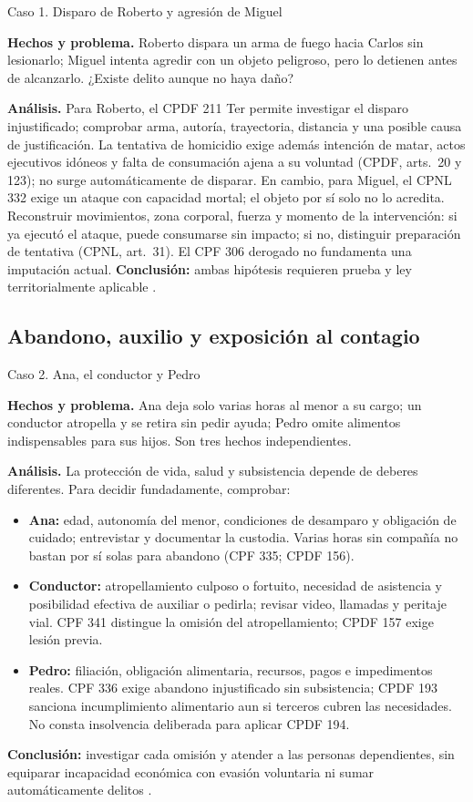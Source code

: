 \documentclass[spanish,letterpaper,oneside]{article}
\newcommand{\fichacaso}[1]{%
  \begin{tcolorbox}[colback=white,colframe=casoverde!25,
    boxrule=0.4pt,arc=0.6mm,left=1.6mm,right=1.6mm,top=1mm,bottom=1mm,
    before skip=0pt,after skip=3pt]
    #1
  \end{tcolorbox}%
}
\begin{document}
\begin{casoestudio}{Caso 1. Disparo de Roberto y agresión de Miguel}
\fichacaso{\textbf{Hechos y problema.} Roberto dispara un arma de fuego hacia Carlos sin lesionarlo; Miguel intenta agredir con un objeto peligroso, pero lo detienen antes de alcanzarlo. ¿Existe delito aunque no haya daño?}
\textbf{Análisis.} Para Roberto, el CPDF 211 Ter permite investigar el disparo injustificado; comprobar arma, autoría, trayectoria, distancia y una posible causa de justificación. La tentativa de homicidio exige además intención de matar, actos ejecutivos idóneos y falta de consumación ajena a su voluntad (CPDF, arts.~20 y 123); no surge automáticamente de disparar. En cambio, para Miguel, el CPNL 332 exige un ataque con capacidad mortal; el objeto por sí solo no lo acredita. Reconstruir movimientos, zona corporal, fuerza y momento de la intervención: si ya ejecutó el ataque, puede consumarse sin impacto; si no, distinguir preparación de tentativa (CPNL, art.~31). El CPF 306 derogado no fundamenta una imputación actual. \textbf{Conclusión:} ambas hipótesis requieren prueba y ley territorialmente aplicable \citep{cpdfS4Vigente,cpnlS4Vigente,cpfS4Vigente}.
\end{casoestudio}

\clearpage
\subsection*{Abandono, auxilio y exposición al contagio}
\begin{casoestudio}{Caso 2. Ana, el conductor y Pedro}
\fichacaso{\textbf{Hechos y problema.} Ana deja solo varias horas al menor a su cargo; un conductor atropella y se retira sin pedir ayuda; Pedro omite alimentos indispensables para sus hijos. Son tres hechos independientes.}
\textbf{Análisis.} La protección de vida, salud y subsistencia depende de deberes diferentes. Para decidir fundadamente, comprobar:
\begin{itemize}[leftmargin=*,topsep=1pt,itemsep=1pt,parsep=0pt]
\item \textbf{Ana:} edad, autonomía del menor, condiciones de desamparo y obligación de cuidado; entrevistar y documentar la custodia. Varias horas sin compañía no bastan por sí solas para abandono (CPF 335; CPDF 156).
\item \textbf{Conductor:} atropellamiento culposo o fortuito, necesidad de asistencia y posibilidad efectiva de auxiliar o pedirla; revisar video, llamadas y peritaje vial. CPF 341 distingue la omisión del atropellamiento; CPDF 157 exige lesión previa.
\item \textbf{Pedro:} filiación, obligación alimentaria, recursos, pagos e impedimentos reales. CPF 336 exige abandono injustificado sin subsistencia; CPDF 193 sanciona incumplimiento alimentario aun si terceros cubren las necesidades. No consta insolvencia deliberada para aplicar CPDF 194.
\end{itemize}
\textbf{Conclusión:} investigar cada omisión y atender a las personas dependientes, sin equiparar incapacidad económica con evasión voluntaria ni sumar automáticamente delitos \citep{cpfS4Vigente,cpdfS4Vigente}.
\end{casoestudio}
\end{document}
